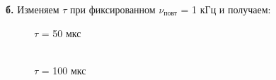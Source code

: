\documentclass[a4paper,12pt]{article}
\begin{document}
\begin{enumerate}
\newpage


\textbf{б.} Изменяем $\tau$ при фиксированном $\nu_\text{повт}$ = 1 кГц и получаем:

\begin{figure}[h]
\begin{minipage}[h]{0.47\linewidth}
 $\tau$ = 50 мкс \\
\end{minipage}
\hfill
\begin{minipage}[h]{0.47\linewidth}
 \\ $\tau$ = 100 мкс
\end{minipage}

\end{figure}
\end{enumerate}
\end{document}
